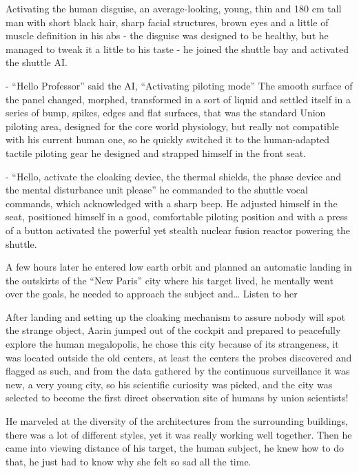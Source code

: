 \documentclass[colorlinks,12pt,a4paper]{book}
\begin{document}
Activating the human \gls{disguise}, an average-looking, young, thin and 180 cm tall man with short black hair, 
sharp facial structures, brown eyes and a little of muscle definition in his abs - the disguise was designed to be healthy, but he managed to tweak it a little to his taste -
 he joined the shuttle bay and activated the shuttle AI.\par
 \bigskip

- “Hello Professor” said the AI, “Activating piloting mode”\newline
The smooth surface of the panel changed, morphed, transformed in a sort of liquid and settled itself 
in a series of bump, spikes, edges and flat surfaces, that was the standard Union piloting area, 
designed for the core world physiology, but really not compatible with his current human one, so he 
quickly switched it to the human-adapted tactile piloting gear he designed and strapped himself in the front seat.\par
\bigskip

- “Hello, activate the cloaking device, the thermal shields, the phase device and the mental disturbance unit please” 
he commanded to the shuttle vocal commands, 
which acknowledged with a sharp beep. 
He adjusted himself in the seat, positioned himself in a good, comfortable piloting position and with a press 
of a button activated the powerful yet stealth nuclear fusion reactor powering the shuttle.\par
\bigskip

A few hours later he entered low earth orbit and planned an automatic landing in the outskirts of the 
“New Paris” city where his target lived, he mentally went over the goals, he needed to approach the 
subject and… Listen to her\par
\bigskip

After landing and setting up the cloaking mechanism to assure nobody will spot the strange object, 
Aarin jumped out of the cockpit and prepared to peacefully explore the human megalopolis, 
he chose this city because of its strangeness, it was located outside the old centers, 
at least the centers the probes discovered and flagged as such, and from the data gathered by the continuous 
surveillance it was new, a very young city, so his scientific curiosity was picked, and the city was selected to 
become the first direct observation site of humans by union scientists!\par
\bigskip

He marveled at the diversity of the architectures from the surrounding buildings, 
there was a lot of different styles, yet it was really working well together. Then he came into viewing distance of his target,
 the human subject, he knew how to do that, he just had to know why she felt so sad all the time. \par
 \bigskip
\end{document}
